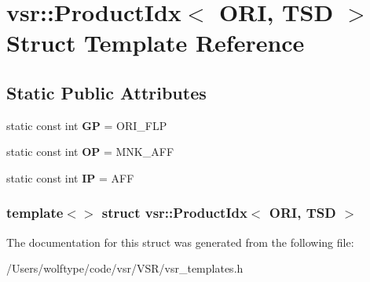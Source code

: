 \hypertarget{structvsr_1_1_product_idx_3_01_o_r_i_00_01_t_s_d_01_4}{\section{vsr\-:\-:Product\-Idx$<$ O\-R\-I, T\-S\-D $>$ Struct Template Reference}
\label{structvsr_1_1_product_idx_3_01_o_r_i_00_01_t_s_d_01_4}
}
\subsection*{Static Public Attributes}
\begin{DoxyCompactItemize}
\item 
\hypertarget{structvsr_1_1_product_idx_3_01_o_r_i_00_01_t_s_d_01_4_a4a3eff5d53afa25dc1aa13552732c994}{static const int {\bfseries G\-P} = O\-R\-I\-\_\-\-F\-L\-P}\label{structvsr_1_1_product_idx_3_01_o_r_i_00_01_t_s_d_01_4_a4a3eff5d53afa25dc1aa13552732c994}

\item 
\hypertarget{structvsr_1_1_product_idx_3_01_o_r_i_00_01_t_s_d_01_4_a0a5773e852f9219dd3d8482a48722e30}{static const int {\bfseries O\-P} = M\-N\-K\-\_\-\-A\-F\-F}\label{structvsr_1_1_product_idx_3_01_o_r_i_00_01_t_s_d_01_4_a0a5773e852f9219dd3d8482a48722e30}

\item 
\hypertarget{structvsr_1_1_product_idx_3_01_o_r_i_00_01_t_s_d_01_4_a44ea0dc435c94fda1c3ebfb84cfdec4f}{static const int {\bfseries I\-P} = A\-F\-F}\label{structvsr_1_1_product_idx_3_01_o_r_i_00_01_t_s_d_01_4_a44ea0dc435c94fda1c3ebfb84cfdec4f}

\end{DoxyCompactItemize}
\subsubsection*{template$<$$>$ struct vsr\-::\-Product\-Idx$<$ O\-R\-I, T\-S\-D $>$}



The documentation for this struct was generated from the following file\-:\begin{DoxyCompactItemize}
\item 
/\-Users/wolftype/code/vsr/\-V\-S\-R/vsr\-\_\-templates.\-h\end{DoxyCompactItemize}
